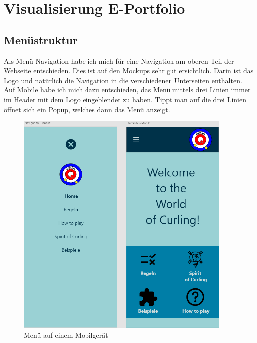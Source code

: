 \documentclass[11pt]{article}
\begin{document}
    \section{Visualisierung E-Portfolio}

    \subsection{Menüstruktur}
    Als Menü-Navigation habe ich mich für eine Navigation am oberen Teil der Webseite entschieden. Dies ist
    auf den Mockups sehr gut ersichtlich. Darin ist das Logo und natürlich die Navigation in die verschiedenen
    Unterseiten enthalten.\\
    Auf Mobile habe ich mich dazu entschieden, das Menü mittels drei Linien immer im Header mit dem Logo
    eingeblendet zu haben. Tippt man auf die drei Linien öffnet sich ein Popup, welches dann das Menü anzeigt.

    \begin{figure}[h]
        \centering
        \includegraphics[height=11cm]{media/menu_mobile}
        \caption{Menü auf einem Mobilgerät}
    \end{figure}

\end{document}
